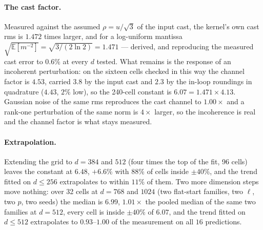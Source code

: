 \paragraph{The cast factor.}  Measured against the assumed $\rho=u/\sqrt3$ of the input
cast, the kernel's own cast rms is $1.472$ times larger, and for a log-uniform mantissa
$\sqrt{\mathbb{E}[m^{-2}]}=\sqrt{3/(2\ln2)}=1.471$ --- derived, and reproducing the
measured cast error to $0.6\%$ at every $d$ tested.  What remains is the response of an
incoherent perturbation: on the sixteen cells checked in this way the channel factor is
$4.53$, carried $3.8$ by the input cast and $2.3$ by the in-loop roundings in quadrature
($4.43$, $2\%$ low), so the 240-cell constant is $6.07=1.471\times4.13$.  Gaussian noise
of the same rms reproduces the cast channel to $1.00\times$ and a rank-one perturbation of
the same norm is $4\times$ larger, so the incoherence is real and the channel factor is
what stays measured.

\paragraph{Extrapolation.}  Extending the grid to $d=384$ and $512$ (four times the top of
the fit, 96 cells) leaves the constant at $6.48$, $+6.6\%$ with $88\%$ of cells inside
$\pm40\%$, and the trend fitted on $d\le256$ extrapolates to within $11\%$ of them.  Two
more dimension steps move nothing: over 32 cells at $d=768$ and $1024$ (two flat-start
families, two $\ell$, two $p$, two seeds) the median is $6.99$, $1.01\times$ the pooled
median of the same two families at $d=512$, every cell is inside $\pm40\%$ of $6.07$, and
the trend fitted on $d\le512$ extrapolates to $0.93$--$1.00$ of the measurement on all
$16$ predictions.

